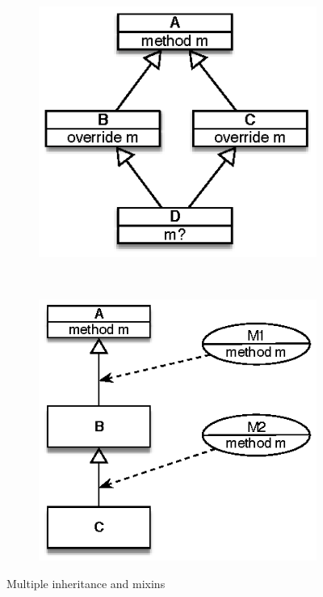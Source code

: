 \begin{figure}
  \centering
  \begin{subfigure}[b]{0.45\textwidth}
    \includegraphics{figures/diamond.eps}
     \label{fig:diamond}
  \end{subfigure} ~
  \begin{subfigure}[b]{0.45\textwidth}
    \includegraphics{figures/mixin.eps}
     \label{fig:mixin}
  \end{subfigure}
  \caption{Multiple inheritance and mixins}
\end{figure}



